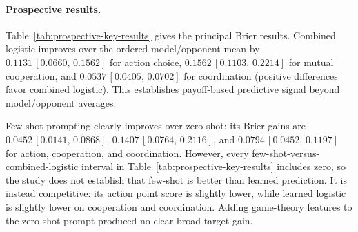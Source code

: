 \paragraph{Prospective results.}
Table~\ref{tab:prospective-key-results} gives the principal Brier results. Combined logistic improves over the ordered model/opponent mean by \(0.1131\,[0.0660,\,0.1562]\) for action choice, \(0.1562\,[0.1103,\,0.2214]\) for mutual cooperation, and \(0.0537\,[0.0405,\,0.0702]\) for coordination (positive differences favor combined logistic). This establishes payoff-based predictive signal beyond model/opponent averages.

\begin{table}[tb]
  \centering
  \small
  \caption{Prospective event Brier scores (lower is better) and paired Brier improvement of few-shot over combined logistic, computed as combined-logistic Brier minus few-shot Brier (positive favors few-shot). Brackets are descriptive 95\% game/episode bootstrap intervals conditional on fixed forecasts.}
  \label{tab:prospective-key-results}
\end{table}

Few-shot prompting clearly improves over zero-shot: its Brier gains are \(0.0452\,[0.0141,\,0.0868]\), \(0.1407\,[0.0764,\,0.2116]\), and \(0.0794\,[0.0452,\,0.1197]\) for action, cooperation, and coordination. However, every few-shot-versus-combined-logistic interval in Table~\ref{tab:prospective-key-results} includes zero, so the study does not establish that few-shot is better than learned prediction. It is instead competitive: its action point score is slightly lower, while learned logistic is slightly lower on cooperation and coordination. Adding game-theory features to the zero-shot prompt produced no clear broad-target gain.

